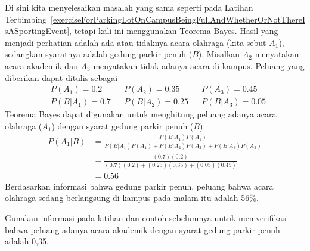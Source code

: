 \begin{examplewrap}
\begin{nexample}{Di sini kita menyelesaikan masalah yang sama seperti pada Latihan Terbimbing~\ref{exerciseForParkingLotOnCampusBeingFullAndWhetherOrNotThereIsASportingEvent}, tetapi kali ini menggunakan Teorema Bayes.}
Hasil yang menjadi perhatian adalah ada atau tidaknya acara olahraga (kita sebut $A_1$), sedangkan syaratnya adalah gedung parkir penuh ($B$). Misalkan $A_2$ menyatakan acara akademik dan $A_3$ menyatakan tidak adanya acara di kampus. Peluang yang diberikan dapat ditulis sebagai
\begin{align*}
&P(A_1) = 0.2 &&P(A_2) = 0.35 &&P(A_3) = 0.45 \\
&P(B | A_1) = 0.7 &&P(B | A_2) = 0.25 &&P(B | A_3) = 0.05
\end{align*}
Teorema Bayes dapat digunakan untuk menghitung peluang adanya acara olahraga ($A_1$) dengan syarat gedung parkir penuh ($B$):
\begin{align*}
P(A_1 | B) &= \frac{P(B | A_1) P(A_1)}{P(B | A_1) P(A_1) + P(B | A_2) P(A_2) + P(B | A_3) P(A_3)} \\
		&= \frac{(0.7)(0.2)}{(0.7)(0.2) + (0.25)(0.35) + (0.05)(0.45)} \\
		&= 0.56 
\end{align*}
Berdasarkan informasi bahwa gedung parkir penuh, peluang bahwa acara olahraga sedang berlangsung di kampus pada malam itu adalah 56\%.
\end{nexample}
\end{examplewrap}

\D{\newpage}

\begin{exercisewrap}
\begin{nexercise} \label{exerciseForParkingLotOnCampusBeingFullAndWhetherOrNotThereIsAnAcademicEvent}
Gunakan informasi pada latihan dan contoh sebelumnya untuk memverifikasi bahwa peluang adanya acara akademik dengan syarat gedung parkir penuh adalah 0,35.\footnotemark
\end{nexercise}
\end{exercisewrap}

